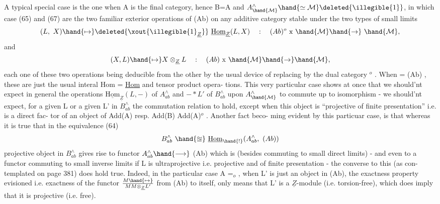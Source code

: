 A typical special case is the one when A is the final category,
hence B=A and $A^\wedge_{\hand{\mathcal{M}}}\hand{\simeq \mathcal{M}}\deleted{\illegible{1}}$, in which case (65) and (67) are the two familiar
exterior operations of (Ab) on any additive category stable under the
two types of small limits
\[ (L,\ X)\hand{\mapsto}\deleted{\xout{\illegible{1}_{\underline{Z}}}}\ \underline{\mathrm{Hom}}_{\underline{Z}}(L,X) \quad : \quad (Ab)^{o}\ \mathrm{x}\ \hand{\mathcal{M}}\hand{\to}\ \hand{\mathcal{M}}, \]
and
\[ (X,L)\hand{\mapsto} X\otimes_{\underline{Z}}L \quad : \quad (Ab)\ \mathrm{x}\ \hand{\mathcal{M}}\hand{\to}\hand{\mathcal{M}}, \]
each one of these two operations being deducible from the other by the
usual device of replacing  by the dual category $^{o}$ .  When = (Ab) ,
these are just the usual interal  Hom = \uline{Hom}  and tensor product opera-%
tions.  This very particular case shows at once that we should'nt expect
in general the operations  $\underline{\mathrm{Hom}}_{\underline{Z}}(L,-)$ of $A^\wedge_{ab}$  and  $-*L'$  of $B^\wedge_{ab}$  upon
$A^\wedge_{\hand{\mathcal{M}}}$  to commute up to isomorphism  -  we should'nt expect,  for a given
L  or a given L' in $B^\wedge_{ab}$ the commutation relation to hold,  except when
this object is ``projective of finite presentation''  i.e. is a direct fac-%
tor of an object of Add(A)  resp.  Add(B) \hand{$\approxeq$} Add(A)$^{o}$ .  Another fact beco-%
ming evident by this particuar case,  is that whereas it is true that
in the equivalence (64)
\[ B^\wedge_{ab}\ \hand{\approxeq}\ \underline{\mathrm{Hom}}_{\hand{!}}(A^\wedge_{ab},\ (Ab)) \]
 projective object  in $B^\wedge_{ab}$ gives rise to  functor  $A^\wedge_{ab}\hand{\longrightarrow}$ (Ab) which is
\hand{\uline{\textcolor{black}{exact}}} (besides commuting to  small direct limits)  -  and even to a
functor commuting to small inverse limits if L is ultraprojective i.e.
projective and of finite presentation -  the converse to this (as con-%
templated on page 381) does \hand{\uline{\textcolor{black}{not}}} hold true.  Indeed,  in the particular
case A =\hand{$\Delta$}$_{o}$ ,  when L' is just an  object in (Ab),  the
exactness property evisioned i.e. exactness of the functor  $M\hand{\mapsto}\over{M}{M}\otimes_{\underline{Z}}L'$
from (Ab) to itself,  only means that L' is a \hand{\uline{\textcolor{black}{flat}}}  $\underline{Z}$-module (i.e.
torsion-free),  which does \hand{\uline{\textcolor{black}{not}}} imply that it is projective (i.e. free).

